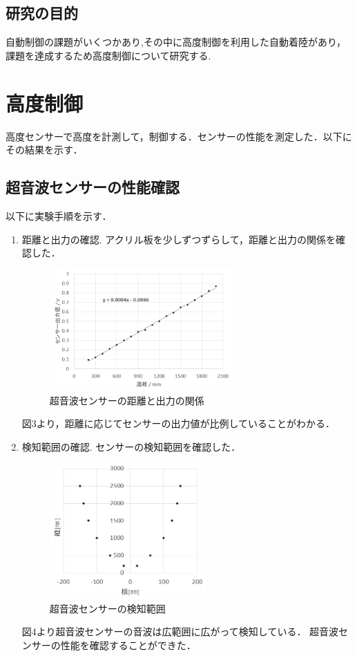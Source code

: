\documentclass[twocolumn,11pt]{abst}
\begin{document}
\subsection{研究の目的}
自動制御の課題がいくつかあり,その中に高度制御を利用した自動着陸があり，課題を達成するため高度制御について研究する.


\section{高度制御}

高度センサーで高度を計測して，制御する．センサーの性能を測定した．以下にその結果を示す．

\subsection{超音波センサーの性能確認}
以下に実験手順を示す．


\begin{enumerate}
  \item 距離と出力の確認.
アクリル板を少しずつずらして，距離と出力の関係を確認した．
\begin{figure}[htbp]
  \begin{center}
   \includegraphics[width=70mm]{img/距離と出力.jpg}
    \end{center}
  \caption{超音波センサーの距離と出力の関係}
 \label{fig:ensyu3tex}
\end{figure}
図3より，距離に応じてセンサーの出力値が比例していることがわかる．
  \item 検知範囲の確認.
センサーの検知範囲を確認した．
\begin{figure}[htbp]
  \begin{center}
   \includegraphics[width=60mm]{img/検知範囲.jpg}
    \end{center}
  \caption{超音波センサーの検知範囲}
 \label{fig:ensyu3tex}
\end{figure}
図4より超音波センサーの音波は広範囲に広がって検知している．
超音波センサーの性能を確認することができた．

\end{enumerate}
\end{document}
